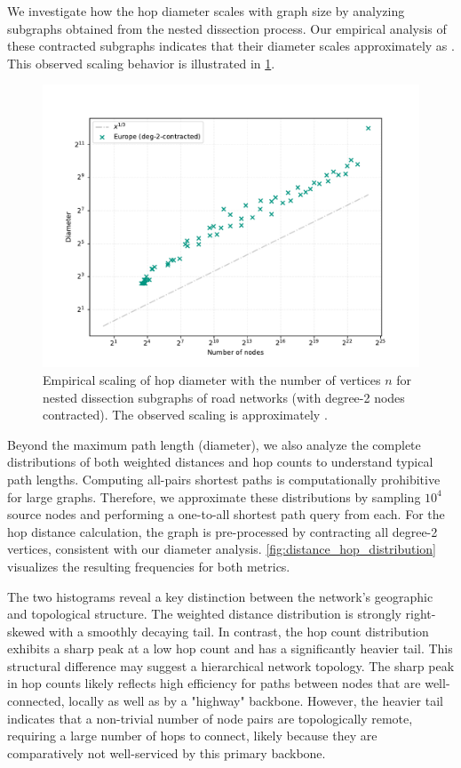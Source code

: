 We investigate how the hop diameter scales with graph size by analyzing subgraphs obtained from the nested dissection process.
Our empirical analysis of these contracted subgraphs indicates that their diameter scales approximately as .
This observed scaling behavior is illustrated in \cref{fig:road_network_diameter_scaling}.

\begin{figure}[tbhp]
    \centering
    \includegraphics[width=0.6\linewidth]{graphics/diam-europe-ifub.pdf}
    \caption{Empirical scaling of hop diameter with the number of vertices \(n\) for nested dissection subgraphs of road networks (with degree-2 nodes contracted). The observed scaling is approximately .}
    \label{fig:road_network_diameter_scaling}
\end{figure}

Beyond the maximum path length (diameter), we also analyze the complete distributions of both weighted distances and hop counts to understand typical path lengths.
Computing all-pairs shortest paths is computationally prohibitive for large graphs.
Therefore, we approximate these distributions by sampling \(10^4\) source nodes and performing a one-to-all shortest path query from each.
For the hop distance calculation, the graph is pre-processed by contracting all degree-2 vertices, consistent with our diameter analysis.
\cref{fig:distance_hop_distribution} visualizes the resulting frequencies for both metrics.

The two histograms reveal a key distinction between the network's geographic and topological structure.
The weighted distance distribution is strongly right-skewed with a smoothly decaying tail.
In contrast, the hop count distribution exhibits a sharp peak at a low hop count and has a significantly heavier tail.
This structural difference may suggest a hierarchical network topology.
The sharp peak in hop counts likely reflects high efficiency for paths between nodes that are well-connected, locally as well as by a "highway" backbone. However, the heavier tail indicates that a non-trivial number of node pairs are topologically remote, requiring a large number of hops to connect, likely because they are comparatively not well-serviced by this primary backbone.

